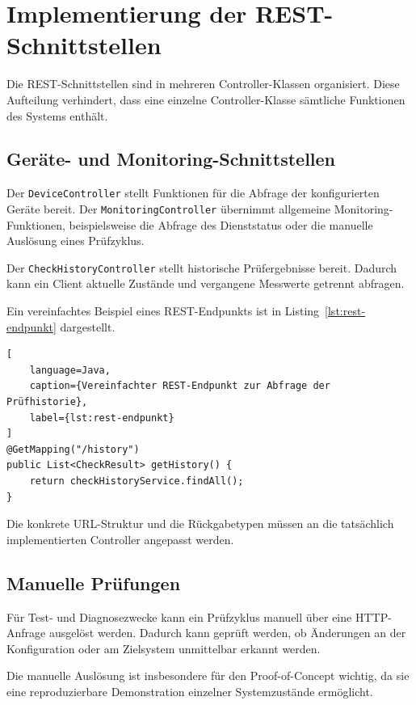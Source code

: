 \section{Implementierung der REST-Schnittstellen}
\label{sec:implementierung-rest}

Die REST-Schnittstellen sind in mehreren Controller-Klassen organisiert. Diese Aufteilung verhindert, dass eine einzelne Controller-Klasse sämtliche Funktionen des Systems enthält.

\subsection{Geräte- und Monitoring-Schnittstellen}
\label{subsec:geraete-monitoring-api}

Der \texttt{DeviceController} stellt Funktionen für die Abfrage der konfigurierten Geräte bereit. Der \texttt{MonitoringController} übernimmt allgemeine Monitoring-Funktionen, beispielsweise die Abfrage des Dienststatus oder die manuelle Auslösung eines Prüfzyklus.

Der \texttt{CheckHistoryController} stellt historische Prüfergebnisse bereit. Dadurch kann ein Client aktuelle Zustände und vergangene Messwerte getrennt abfragen.

Ein vereinfachtes Beispiel eines REST-Endpunkts ist in Listing~\ref{lst:rest-endpunkt} dargestellt.

\begin{lstlisting}[
    language=Java,
    caption={Vereinfachter REST-Endpunkt zur Abfrage der Prüfhistorie},
    label={lst:rest-endpunkt}
]
@GetMapping("/history")
public List<CheckResult> getHistory() {
    return checkHistoryService.findAll();
}
\end{lstlisting}

Die konkrete URL-Struktur und die Rückgabetypen müssen an die tatsächlich implementierten Controller angepasst werden.

\subsection{Manuelle Prüfungen}
\label{subsec:manuelle-pruefungen}

Für Test- und Diagnosezwecke kann ein Prüfzyklus manuell über eine HTTP-Anfrage ausgelöst werden. Dadurch kann geprüft werden, ob Änderungen an der Konfiguration oder am Zielsystem unmittelbar erkannt werden.

Die manuelle Auslösung ist insbesondere für den Proof-of-Concept wichtig, da sie eine reproduzierbare Demonstration einzelner Systemzustände ermöglicht.

